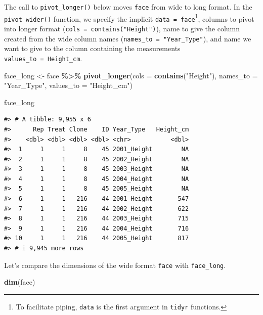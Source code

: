\documentclass[
  11pt,
]{krantz}
\newenvironment{Shaded}{\begin{snugshade}}{\end{snugshade}}
\newcommand{\DataTypeTok}[1]{\textcolor[rgb]{0.13,0.29,0.53}{#1}}
\newcommand{\KeywordTok}[1]{\textcolor[rgb]{0.13,0.29,0.53}{\textbf{#1}}}
\newcommand{\NormalTok}[1]{#1}
\newcommand{\OperatorTok}[1]{\textcolor[rgb]{0.81,0.36,0.00}{\textbf{#1}}}
\newcommand{\StringTok}[1]{\textcolor[rgb]{0.31,0.60,0.02}{#1}}
\theoremstyle{definition}
\theoremstyle{definition}
\theoremstyle{definition}
\theoremstyle{definition}
\theoremstyle{remark}
\begin{document}
The call to \texttt{pivot\_longer()} below moves \texttt{face} from wide to long format. In the \texttt{pivot\_wider()} function, we specify the implicit \texttt{data\ =\ face}\footnote{To facilitate piping, \texttt{data} is the first argument in \texttt{tidyr} functions.}, columns to pivot into longer format (\texttt{cols\ =\ contains("Height")}), name to give the column created from the wide column names (\texttt{names\_to\ =\ "Year\_Type"}), and name we want to give to the column containing the measurements \texttt{values\_to\ =\ \textquotesingle{}Height\_cm\textquotesingle{}}.

\begin{Shaded}
\begin{Highlighting}[]
\NormalTok{face\_long \textless{}{-}}\StringTok{ }\NormalTok{face }\OperatorTok{\%\textgreater{}\%}\StringTok{ }\KeywordTok{pivot\_longer}\NormalTok{(}\DataTypeTok{cols =} \KeywordTok{contains}\NormalTok{(}\StringTok{"Height"}\NormalTok{),}
                                   \DataTypeTok{names\_to =} \StringTok{"Year\_Type"}\NormalTok{,}
                                   \DataTypeTok{values\_to =} \StringTok{"Height\_cm"}\NormalTok{)}

\NormalTok{face\_long}
\end{Highlighting}
\end{Shaded}

\begin{verbatim}
#> # A tibble: 9,955 x 6
#>      Rep Treat Clone    ID Year_Type   Height_cm
#>    <dbl> <dbl> <dbl> <dbl> <chr>           <dbl>
#>  1     1     1     8    45 2001_Height        NA
#>  2     1     1     8    45 2002_Height        NA
#>  3     1     1     8    45 2003_Height        NA
#>  4     1     1     8    45 2004_Height        NA
#>  5     1     1     8    45 2005_Height        NA
#>  6     1     1   216    44 2001_Height       547
#>  7     1     1   216    44 2002_Height       622
#>  8     1     1   216    44 2003_Height       715
#>  9     1     1   216    44 2004_Height       716
#> 10     1     1   216    44 2005_Height       817
#> # i 9,945 more rows
\end{verbatim}

Let's compare the dimensions of the wide format \texttt{face} with \texttt{face\_long}.

\begin{Shaded}
\begin{Highlighting}[]
\KeywordTok{dim}\NormalTok{(face)}
\end{Highlighting}
\end{Shaded}
\end{document}
